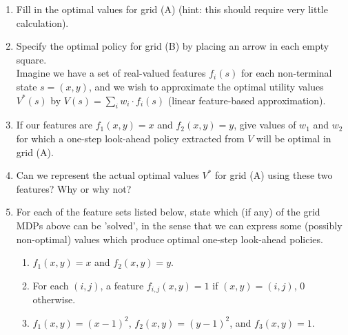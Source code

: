 \documentclass[12pt]{article}
\begin{document}
\begin{enumerate}

\item Fill in the optimal values for grid (A) (hint: this should require very little calculation).

\item  Specify the optimal policy for grid (B) by placing an arrow in each empty square. \\

  Imagine we have a set of real-valued features $f_i(s)$ for each
  non-terminal state $s = (x, y)$, and we wish to approximate the
  optimal utility values $V^*(s)$ by $V(s) = \sum_i w_i \cdot f_i(s)$
  (linear feature-based approximation).

\item If our features are $f_1(x, y) = x$ and $f_2(x, y) = y$, give
  values of $w_1$ and $w_2$ for which a one-step look-ahead policy extracted
  from $V$ will be optimal in grid (A).

\item Can we represent the actual optimal values $V^*$ for grid (A)
  using these two features?  Why or why not?

\clearpage

\item For each of the feature sets listed below, state which (if any)
  of the grid MDPs above can be 'solved', in the sense that we can
  express some (possibly non-optimal) values which produce optimal
  one-step look-ahead policies.

  \begin{enumerate}

  \item $f_1(x, y) = x$ and $f_2(x, y) = y$.

  \item For each $(i, j)$, a feature $f_{i,j}(x, y) = 1$ if $(x, y) = (i, j)$, 0 otherwise.

  \item $f_1(x, y) = (x - 1)^2$, $f_2(x, y) = (y - 1)^2$, and $f_3(x, y) = 1$.

  \end{enumerate}

\end{enumerate}
\end{document}
